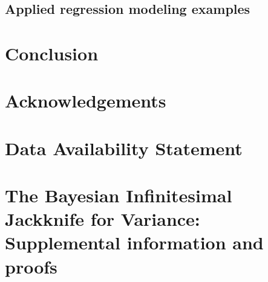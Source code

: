 \documentclass[12pt]{article} %
\begin{document}
\subsection{Applied regression modeling examples}



\section{Conclusion}


 { 
    \section{Acknowledgements}
    
}

\section{Data Availability Statement}


\printbibliography{}


 {
    \newpage
    \section*{The Bayesian Infinitesimal Jackknife for Variance: Supplemental information and proofs}
    
}
\end{document}
